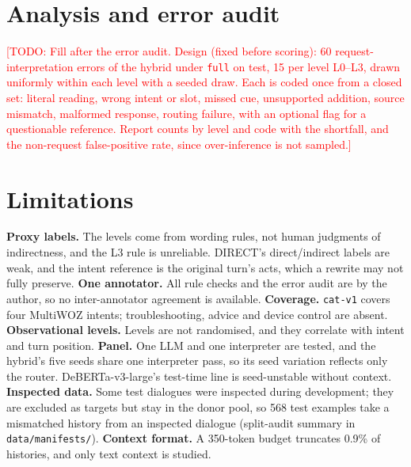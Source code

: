 \documentclass{article}
\newcommand{\todo}[1]{\textcolor{red}{[TODO: #1]}}
\begin{document}
\section{Analysis and error audit}
\label{sec:audit}

\todo{Fill after the error audit. Design (fixed before scoring): 60 request-interpretation errors
of the hybrid under \texttt{full} on test, 15 per level L0--L3, drawn uniformly within each level
with a seeded draw. Each is coded once from a closed set: literal reading, wrong intent or slot,
missed cue, unsupported addition, source mismatch, malformed response, routing failure, with an
optional flag for a questionable reference. Report counts by level and code with the shortfall,
and the non-request false-positive rate, since over-inference is not sampled.}

\section{Limitations}
\label{sec:limitations}

\textbf{Proxy labels.} The levels come from wording rules, not human judgments of indirectness,
and the L3 rule is unreliable. DIRECT's direct/indirect labels are weak, and the intent
reference is the original turn's acts, which a rewrite may not fully preserve. \textbf{One
annotator.} All rule checks and the error audit are by the author, so no inter-annotator agreement
is available. \textbf{Coverage.} \texttt{cat-v1} covers four MultiWOZ intents; troubleshooting,
advice and device control are absent. \textbf{Observational levels.} Levels are not randomised,
and they correlate with intent and turn position. \textbf{Panel.} One LLM and one interpreter
are tested, and the hybrid's five seeds share one interpreter pass, so its seed variation reflects
only the router. DeBERTa-v3-large's test-time line is seed-unstable without context.
\textbf{Inspected data.} Some test dialogues were inspected during development; they are
excluded as targets but stay in the donor pool, so 568 test examples take a mismatched history
from an inspected dialogue (split-audit summary in \texttt{data/manifests/}). \textbf{Context
format.} A 350-token budget truncates 0.9\% of histories, and only text context is studied.

\end{document}
